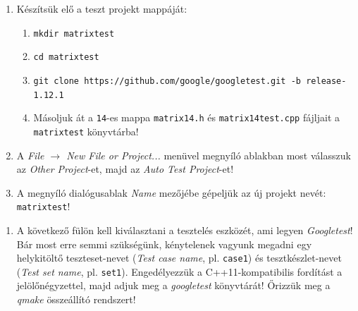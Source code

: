 \begin{frame}
  \begin{enumerate}
    \setcounter{enumi}{\theqt}
    \item Készítsük elő a teszt projekt mappáját:
    \begin{enumerate}
      \item \texttt{mkdir matrixtest}
      \item \texttt{cd matrixtest}
      \item \texttt{git clone https://github.com/google/googletest.git -b release-1.12.1}
      \item Másoljuk át a \texttt{14}-es mappa \texttt{matrix14.h} és \texttt{matrix14test.cpp} fájljait a \texttt{matrixtest} könyvtárba!
    \end{enumerate}
    \item A \emph{File $\to$ New File or Project...} menüvel megnyíló ablakban most válasszuk az \emph{Other Project}-et, majd az \emph{Auto Test Project}-et!\\
    \item A megnyíló dialógusablak \emph{Name} mezőjébe gépeljük az új projekt nevét: \texttt{matrixtest}!
    \setcounter{qt}{\theenumi}
  \end{enumerate}
\end{frame}

\begin{frame}
  \begin{enumerate}
    \setcounter{enumi}{\theqt}
    \item A következő fülön kell kiválasztani a tesztelés eszközét, ami legyen \emph{Googletest}! Bár most erre semmi 
szükségünk, kénytelenek vagyunk megadni egy helykitöltő teszteset-nevet (\emph{Test case name}, pl. \texttt{case1}) és 
tesztkészlet-nevet (\emph{Test set name}, pl. \texttt{set1}). Engedélyezzük a C++11-kompatibilis fordítást a jelölőnégyzettel, 
majd adjuk meg a \emph{googletest} könyvtárát! Őrizzük meg a \emph{qmake} összeállító rendszert!\\
    \setcounter{qt}{\theenumi}
  \end{enumerate}
\end{frame}

